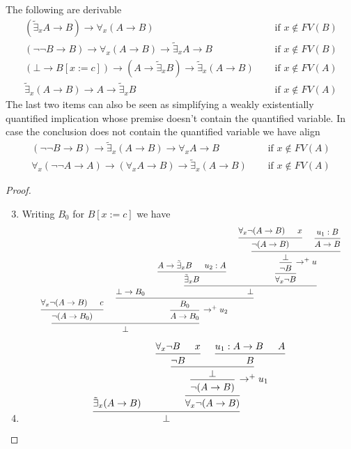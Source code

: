 \documentclass[11pt]{article}
\def \texists {\tilde{\exists}}
\begin{document}
\begin{lemma}[]
The following are derivable
\begin{align*}
(\tilde{\exists}_xA\to B)\to\forall_x(A\to B)&\quad\text{ if }x\not\in FV(B)\\
(\neg\neg B\to B)\to\forall_x(A\to B)\to\tilde{\exists}_xA\to B&\quad\text{ if }x\not\in FV(B)\\
(\bot\to B[x:=c])\to(A\to\tilde{\exists}_xB)\to\texists_x(A\to B)&\quad\text{ if }x\not\in FV(A)\\
\texists_x(A\to B)\to A\to\texists_xB&\quad\text{ if }x\not \in FV(A)
\end{align*}
The last two items can also be seen as simplifying a weakly existentially
quantified implication whose premise doesn't contain the quantified variable.
In case the conclusion does not contain the quantified variable we have
align
\begin{align*}
(\neg\neg B\to B)\to\texists_x(A\to B)\to\forall_xA\to B&\quad\text{ if }x\not \in FV(A)\\
\forall_x(\neg\neg A\to A)\to(\forall_xA\to B)\to\texists_x(A\to B)&\quad\text{ if }x\not \in FV(A)
\end{align*}
\end{lemma}

\begin{proof}
\begin{enumerate}
\setcounter{enumi}{2}
\item Writing \(B_0\) for \(B[x:=c]\) we have
\begin{equation*}
\resizebox{0.9\textwidth}{!}{
\begin{prooftree}[center=false]
\hypo{\forall_x\neg(A\to B)}
\hypo{c}
\infer2{\neg(A\to B_0)}
\hypo{\bot\to B_0}
\hypo{A\to\texists_xB}
\hypo{u_2:A}
\infer2{\texists_xB}
\hypo{\forall_x\neg(A\to B)}
\hypo{x}
\infer2{\neg(A\to B)}
\hypo{u_1:B}
\infer1{A\to B}
\infer2{
\begin{prooftree}
\hypo{\bot}
\infer1[\(\to^+u\)]{\neg B}
\infer1{\forall_x\neg B}
\end{prooftree}
}
\infer2{\bot}
\infer2{B_0}
\infer1[\(\to^+u_2\)]{A\to B_0}
\infer2{\bot}
\end{prooftree}}
\end{equation*}
\item \begin{equation*}
\begin{prooftree}[center=false]
\hypo{\texists_x(A\to B)}
\hypo{\forall_x\neg B}
\hypo{x}
\infer2{\neg B}
\hypo{u_1:A\to B}
\hypo{A}
\infer2{B}
\infer2{\bot}
\infer1[\(\to^+u_1\)]{\neg(A\to B)}
\infer1{\forall_x\neg(A\to B)}
\infer2{\bot}
\end{prooftree}
\end{equation*}
\end{enumerate}
\end{proof}
\end{document}
